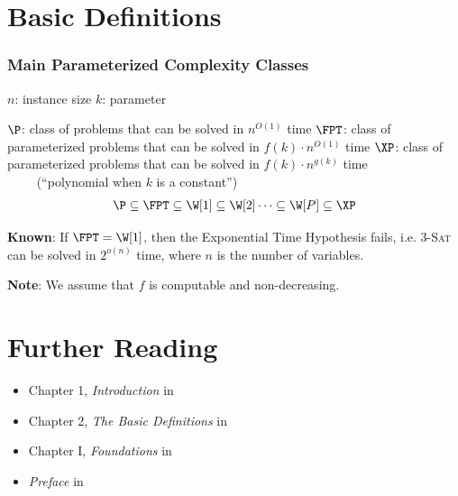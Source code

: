 \section{Basic Definitions}


\begin{frame}
 \frametitle{Main Parameterized Complexity Classes}

 \noindent
 $n$: instance size\newline
 $k$: parameter
 
 \medskip
 \noindent
 $\P$: class of problems that can be solved in $n^{O(1)}$ time\newline
 $\FPT$: class of parameterized problems that can be solved in $f(k) \cdot n^{O(1)}$ time\newline
 $\XP$: class of parameterized problems that can be solved in $f(k) \cdot n^{g(k)}$ time\\ $\qquad$ (``polynomial when $k$ is a constant'')
 \begin{align*}
  \P \subseteq \FPT \subseteq \W[1] \subseteq \W[2] \dots \subseteq \W[P] \subseteq \XP
 \end{align*}

 \noindent
 \textbf{Known}: If $\FPT = \W[1]$, then the Exponential Time Hypothesis fails,
        i.e. 3-\textsc{Sat} can be solved in $2^{o(n)}$ time, where $n$ is the number of variables.
        
 \smallskip
 \noindent
 \textbf{Note}: We assume that $f$ is \alert{computable} and \alert{non-decreasing}.

\end{frame}


\section{Further Reading}

\begin{frame}

  \begin{itemize}
   \item Chapter 1, \emph{Introduction} in \cite{CyganFKL+15}
   \item Chapter 2, \emph{The Basic Definitions} in \cite{DowneyF13}
   \item Chapter I, \emph{Foundations} in \cite{Niedermeier06}
   \item \emph{Preface} in \cite{FlumG06}
  \end{itemize}

\end{frame}

\begin{frame}[t, allowframebreaks]
	\printbibliography
\end{frame}


